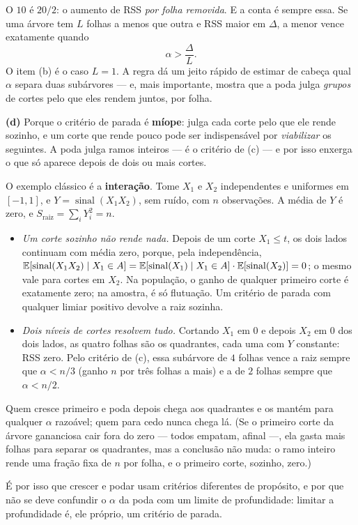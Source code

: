\begin{solucao}
O $10$ é $20/2$: o aumento de RSS \emph{por folha removida}. E a conta é sempre essa.
Se uma árvore tem $L$ folhas a menos que outra e RSS maior em $\Delta$, a menor vence
exatamente quando
\[
  \alpha>\frac{\Delta}{L}.
\]
O item (b) é o caso $L=1$. A regra dá um jeito rápido de estimar de cabeça qual $\alpha$
separa duas subárvores --- e, mais importante, mostra que a poda julga \emph{grupos} de
cortes pelo que eles rendem juntos, por folha.

\smallskip
\textbf{(d)} Porque o critério de parada é \textbf{míope}: julga cada corte pelo que ele
rende sozinho, e um corte que rende pouco pode ser indispensável por \emph{viabilizar}
os seguintes. A poda julga ramos inteiros --- é o critério de (c) --- e por isso enxerga
o que só aparece depois de dois ou mais cortes.

O exemplo clássico é a \textbf{interação}. Tome $X_1$ e $X_2$ independentes e uniformes
em $[-1,1]$, e $Y=\operatorname{sinal}(X_1X_2)$, sem ruído, com $n$ observações. A média
de $Y$ é zero, e $S_{\mathrm{raiz}}=\sum_iY_i^2=n$.
\begin{itemize}[leftmargin=1.2cm]
  \item \emph{Um corte sozinho não rende nada.} Depois de um corte $X_1\le t$, os dois
        lados continuam com média zero, porque, pela independência,
        $\mathbb{E}[\operatorname{sinal}(X_1X_2)\mid X_1\in A]
        =\mathbb{E}[\operatorname{sinal}(X_1)\mid X_1\in A]\cdot\mathbb{E}[\operatorname{sinal}(X_2)]=0$;
        o mesmo vale para cortes em $X_2$. Na população, o ganho de qualquer primeiro
        corte é exatamente zero; na amostra, é só flutuação. Um critério de parada com
        qualquer limiar positivo devolve a raiz sozinha.
  \item \emph{Dois níveis de cortes resolvem tudo.} Cortando $X_1$ em $0$ e depois
        $X_2$ em $0$ dos dois lados, as quatro folhas são os quadrantes, cada uma com
        $Y$ constante: RSS zero. Pelo critério de (c), essa subárvore de $4$ folhas vence
        a raiz sempre que $\alpha<n/3$ (ganho $n$ por três folhas a mais) e a de $2$
        folhas sempre que $\alpha<n/2$.
\end{itemize}
Quem cresce primeiro e poda depois chega aos quadrantes e os mantém para qualquer
$\alpha$ razoável; quem para cedo nunca chega lá. (Se o primeiro corte da árvore
gananciosa cair fora do zero --- todos empatam, afinal ---, ela gasta mais folhas para
separar os quadrantes, mas a conclusão não muda: o ramo inteiro rende uma fração fixa de
$n$ por folha, e o primeiro corte, sozinho, zero.)

É por isso que crescer e podar usam critérios diferentes de propósito, e por que não se
deve confundir o $\alpha$ da poda com um limite de profundidade: limitar a profundidade
é, ele próprio, um critério de parada.
\end{solucao}
